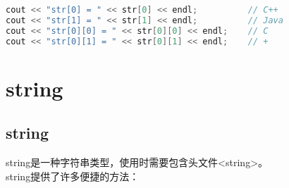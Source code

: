 \begin{lstlisting}[language=C++]
cout << "str[0] = " << str[0] << endl;			// C++
cout << "str[1] = " << str[1] << endl;			// Java
cout << "str[0][0] = " << str[0][0] << endl;	// C
cout << "str[0][1] = " << str[0][1] << endl;	// +
\end{lstlisting}

\newpage

\section{string}

\subsection{string}

string是一种字符串类型，使用时需要包含头文件<string>。\\

string提供了许多便捷的方法：

\begin{table}[H]
	\centering
	\caption{string常用方法}
\end{table}

